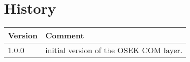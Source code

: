 \chapter{History}

\begin{tabular}{|p{}|p{}|}
\hline 
Version &
Comment
\tabularnewline
\hline
\hline 
1.0.0 &
initial version of the OSEK COM layer.
\tabularnewline
\hline 
\end{tabular}
